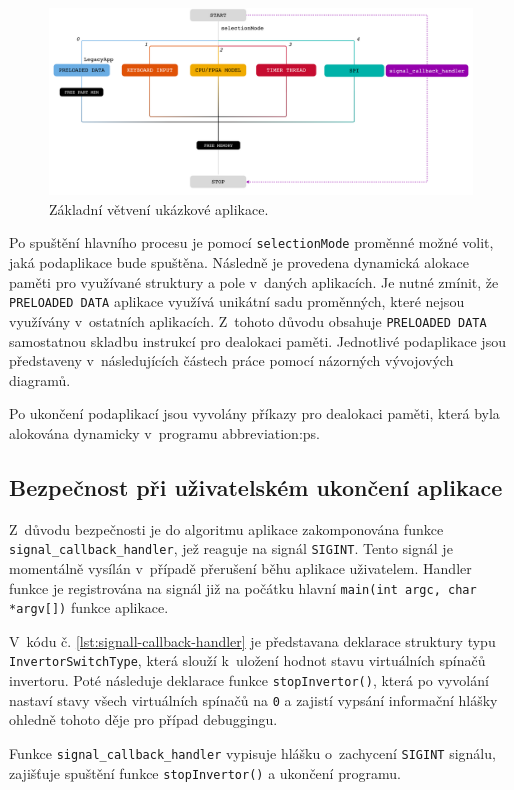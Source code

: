 \documentclass[a4paper, twoside, 11pt]{article}
\newcommand{\fbar}{\FloatBarrier}
\begin{document}
 \begin{figure}[htbp!]
	\centering
	\includegraphics[width=1\textwidth]{src/pdf/application-overview.pdf}
	\caption{Základní větvení ukázkové aplikace.}
	\label{fig:application-overview}
\end{figure}
	Po spuštění hlavního procesu je pomocí \texttt{selectionMode} proměnné možné volit, jaká podaplikace bude spuštěna. Následně je provedena dynamická alokace paměti pro využívané struktury a pole v~daných aplikacích. Je nutné zmínit, že \texttt{PRELOADED DATA} aplikace využívá unikátní sadu proměnných, které nejsou využívány v~ostatních aplikacích. Z~tohoto důvodu obsahuje \texttt{PRELOADED DATA} samostatnou skladbu instrukcí pro dealokaci paměti. Jednotlivé podaplikace jsou představeny v~následujících částech práce pomocí názorných vývojových diagramů.\par
	Po ukončení podaplikací jsou vyvolány příkazy pro dealokaci paměti, která byla alokována dynamicky v~programu \gls{abbreviation:ps}.\par
	\fbar

	\subsection{Bezpečnost při uživatelském ukončení aplikace}
	Z~důvodu bezpečnosti je do algoritmu aplikace zakomponována funkce \texttt{signal\_callback\_handler}, jež reaguje na signál \texttt{SIGINT}. Tento signál je momentálně vysílán v~případě přerušení běhu aplikace uživatelem. Handler funkce je registrována na signál již na počátku hlavní \texttt{main(int argc, char *argv[])} funkce aplikace.\par
	V~kódu č. \ref{lst:signall-callback-handler} je představana deklarace struktury typu \texttt{InvertorSwitchType}, která slouží k~uložení hodnot stavu virtuálních spínačů invertoru. Poté následuje deklarace funkce \texttt{stopInvertor()}, která po vyvolání nastaví stavy všech virtuálních spínačů na \texttt{0} a zajistí vypsání informační hlášky ohledně tohoto děje pro případ debuggingu.\par
	Funkce \texttt{signal\_callback\_handler} vypisuje hlášku o~zachycení \texttt{SIGINT} signálu, zajišťuje spuštění funkce \texttt{stopInvertor()} a ukončení programu.
\end{document}

